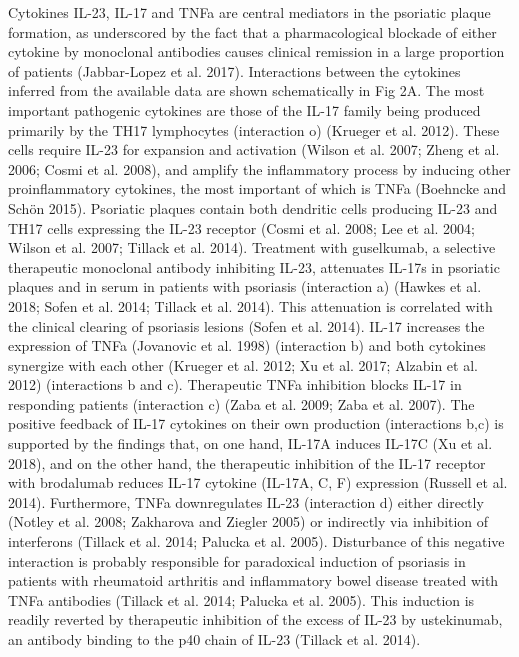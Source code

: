 Cytokines IL-23, IL-17 and TNFa are central mediators in the psoriatic plaque formation, as underscored by the fact that a pharmacological blockade of either cytokine by monoclonal antibodies causes clinical remission in a large proportion of patients (Jabbar-Lopez et al. 2017). Interactions between the cytokines inferred from the available data are shown schematically in Fig 2A. The most important pathogenic cytokines are those of the IL-17 family being produced primarily by the TH17 lymphocytes (interaction o) (Krueger et al. 2012). These cells require IL-23 for expansion and activation (Wilson et al. 2007; Zheng et al. 2006; Cosmi et al. 2008), and amplify the inflammatory process by inducing other proinflammatory cytokines, the most important of which is TNFa (Boehncke and Schön 2015).  Psoriatic plaques contain both dendritic cells producing IL-23 and TH17 cells expressing the IL-23 receptor (Cosmi et al. 2008; Lee et al. 2004; Wilson et al. 2007; Tillack et al. 2014). Treatment with guselkumab, a selective therapeutic monoclonal antibody inhibiting IL-23, attenuates IL-17s in psoriatic plaques and in serum in patients with psoriasis (interaction a) (Hawkes et al. 2018; Sofen et al. 2014; Tillack et al. 2014). This attenuation is correlated with the clinical clearing of psoriasis lesions (Sofen et al. 2014). IL-17 increases the expression of TNFa (Jovanovic et al. 1998) (interaction b) and both cytokines synergize with each other (Krueger et al. 2012; Xu et al. 2017; Alzabin et al. 2012) (interactions b and  c). Therapeutic TNFa inhibition blocks IL-17 in responding patients (interaction c) (Zaba et al. 2009; Zaba et al. 2007). The positive feedback of IL-17 cytokines on their own production (interactions b,c) is supported by the findings that, on one hand, IL-17A induces IL-17C (Xu et al. 2018), and on the other hand, the therapeutic inhibition of the IL-17 receptor with brodalumab reduces IL-17 cytokine (IL-17A, C, F) expression (Russell et al. 2014). Furthermore, TNFa downregulates IL-23 (interaction d) either directly (Notley et al. 2008; Zakharova and Ziegler 2005) or indirectly via inhibition of interferons (Tillack et al. 2014; Palucka et al. 2005). Disturbance of this negative interaction is probably responsible for paradoxical induction of psoriasis in patients with rheumatoid arthritis and inflammatory bowel disease treated with TNFa antibodies (Tillack et al. 2014; Palucka et al. 2005). This induction is readily reverted by therapeutic inhibition of the excess of IL-23 by ustekinumab, an antibody binding to the p40 chain of IL-23 (Tillack et al. 2014). 

